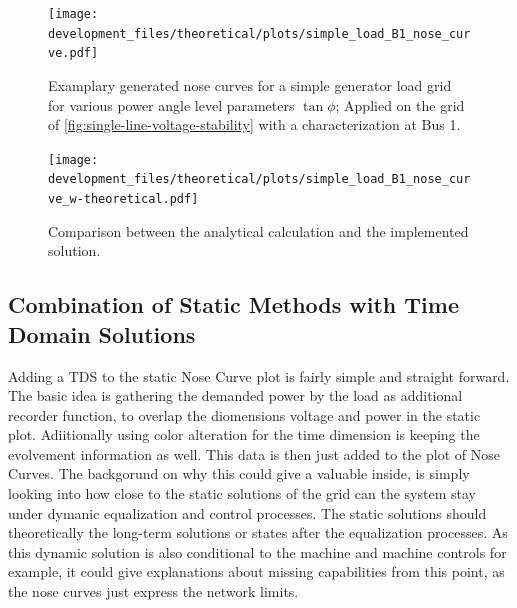 \begin{figure}[htbp!]
        \centering
        \texttt{[image: development\_files/theoretical/plots/simple\_load\_B1\_nose\_curve.pdf]}
        \caption[Examplary generated nose curve for a simple generator - load grid]{Examplary generated nose curves for a simple generator load grid for various power angle level parameters $\tan \phi$; Applied on the grid of \autoref{fig:single-line-voltage-stability} with a characterization at Bus 1.}
        \label{fig:nose-curve-simple-grid}
\end{figure}

\begin{figure}[htbp!]
        \centering
        \texttt{[image: development\_files/theoretical/plots/simple\_load\_B1\_nose\_curve\_w-theoretical.pdf]}
        \caption[Comparison between the analytical calculation and the implemented solution]{Comparison between the analytical calculation and the implemented solution.}
        \label{fig:nose-curve-simple-comp}
\end{figure}


\subsection{Combination of Static Methods with Time Domain Solutions}
\label{sec:comb-time-dimension}

Adding a \acs{TDS} to the static Nose Curve plot is fairly simple and straight forward.
The basic idea is gathering the demanded power by the load as additional recorder function, to overlap the diomensions voltage and power in the static plot.
Adiitionally using color alteration for the time dimension is keeping the evolvement information as well.
This data is then just added to the plot of Nose Curves.
The backgorund on why this could give a valuable inside, is simply looking into how close to the static solutions of the grid can the system stay under dymanic equalization and control processes.
The static solutions should theoretically the long-term solutions or states after the equalization processes.
As this dynamic solution is also conditional to the machine and machine controls for example, it could give explanations about missing capabilities from this point, as the nose curves just express the network limits.

